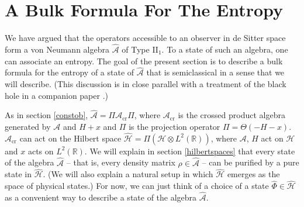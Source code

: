 \documentclass[11pt,a4paper]{article}
\def\h{\widehat}
\def\A{{\mathcal A}}
\def\R{{\mathbb R}}
\def\h{\widehat}
\def\H{{\mathcal H}}
\def\cr{{\mathrm{cr}}}
\begin{document}
\section{A Bulk Formula For The Entropy}\label{bulk}

We have argued that the operators accessible to an observer in de Sitter space form a von Neumann algebra $\h \A$ of Type II$_1$.  To a state of such an algebra,
one can associate an entropy.   The goal of the present section is to describe a bulk formula for the entropy of a state of $\h\A$ that is semiclassical in a sense
that we will describe.   (This discussion is in close parallel with a treatment of the black hole in a companion paper \cite{CPW}.) 

As in section \ref{constob}, $\h\A=\Pi \A_\cr \Pi$, where $\A_\cr$ is the crossed product algebra generated by $\A$ and $H+x$ and $\Pi$ is the projection operator
$\Pi=\Theta(-H-x)$.   $\A_\cr$ can act on the Hilbert space $\h\H=\Pi(\H\otimes L^2(\R))$, where $\A$, $H$ act on $\H$ and $x$ acts on $L^2(\R)$.   We will
explain in section \ref{hilbertspaces} that every state of the algebra $\h\A$ -- that is, every density matrix $\rho\in\h\A$ -- can be purified by a pure state in $\h\H$.
(We will also explain a natural setup in which $\h\H$ emerges as the space of physical states.)   For now, we can just think of a choice of a state $\h\Phi\in\h\H$
as a convenient way to describe a state of the algebra $\h\A$.
\end{document}
